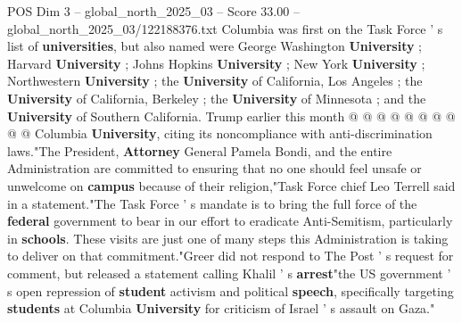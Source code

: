 \begin{textsample}{POS Dim 3 – global\_north\_2025\_03 – Score 33.00 – global\_north\_2025\_03/122188376.txt}
Columbia was first on the Task Force ' s list of \textbf{universities}, but also named were George Washington \textbf{University} ; Harvard \textbf{University} ; Johns Hopkins \textbf{University} ; New York \textbf{University} ; Northwestern \textbf{University} ; the \textbf{University} of California, Los Angeles ; the \textbf{University} of California, Berkeley ; the \textbf{University} of Minnesota ; and the \textbf{University} of Southern California.
Trump earlier this month @ @ @ @ @ @ @ @ @ @ Columbia \textbf{University}, citing its noncompliance with anti-discrimination laws."The President, \textbf{Attorney} General Pamela Bondi, and the entire Administration are committed to ensuring that no one should feel unsafe or unwelcome on \textbf{campus} because of their religion,"Task Force chief Leo Terrell said in a statement."The Task Force ' s mandate is to bring the full force of the \textbf{federal} government to bear in our effort to eradicate Anti-Semitism, particularly in \textbf{schools}.
These visits are just one of many steps this Administration is taking to deliver on that commitment."Greer did not respond to The Post ' s request for comment, but released a statement calling Khalil ' s \textbf{arrest}"the US government ' s open repression of \textbf{student} activism and political \textbf{speech}, specifically targeting \textbf{students} at Columbia \textbf{University} for criticism of Israel ' s assault on Gaza."

\end{textsample}
